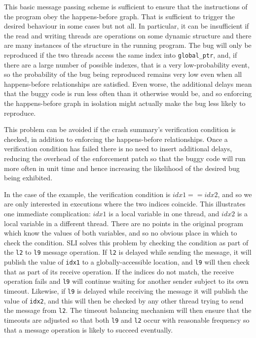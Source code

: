 This basic message passing scheme is sufficient to ensure that the instructions of the program obey the happens-before graph.
That is sufficient to trigger the desired behaviour in some cases but not all.
In particular, it can be insufficient if the read and writing threads are operations on some dynamic structure and there are many instances of the structure in the running program.
The bug will only be reproduced if the two threads access the same index into \verb|global_ptr|, and, if there are a large number of possible indexes, that is a very low-probability event, so the probability of the bug being reproduced remains very low even when all happens-before relationships are satisfied.
Even worse, the additional delays mean that the buggy code is run less often than it otherwise would be, and so enforcing the happens-before graph in isolation might actually make the bug less likely to reproduce.

This problem can be avoided if the crash summary's verification condition is checked, in addition to enforcing the happens-before relationships.
Once a verification condition has failed there is no need to insert additional delays, reducing the overhead of the enforcement patch so that the buggy code will run more often in unit time and hence increasing the likelihood of the desired bug being exhibited.

In the case of the example, the verification condition is $idx1 == idx2$, and so we are only interested in executions where the two indices coincide.
This illustrates one immediate complication: $idx1$ is a local variable in one thread, and $idx2$ is a local variable in a different thread.
There are no points in the original program which know the values of both variables, and so no obvious place in which to check the condition.
SLI solves this problem by checking the condition as part of the \verb|l2| to \verb|l9| message operation.
If \verb|l2| is delayed while sending the message, it will publish the value of \verb|idx1| to a globally-accessible location, and \verb|l9| will then check that as part of its receive operation.
If the indices do not match, the receive operation fails and \verb|l9| will continue waiting for another sender subject to its own timeout.
Likewise, if \verb|l9| is delayed while receiving the message it will publish the value of \verb|idx2|, and this will then be checked by any other thread trying to send the message from \verb|l2|.
The timeout balancing mechanism will then ensure that the timeouts are adjusted so that both \verb|l9| and \verb|l2| occur with reasonable frequency so that a message operation is likely to succeed eventually.

